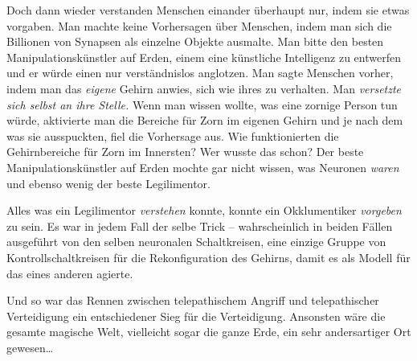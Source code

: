 Doch dann wieder verstanden Menschen einander überhaupt nur, indem sie etwas vorgaben. Man machte keine Vorhersagen über Menschen, indem man sich die Billionen von Synapsen als einzelne Objekte ausmalte. Man bitte den besten Manipulationskünstler auf Erden, einem eine künstliche Intelligenz zu entwerfen und er würde einen nur verständnislos anglotzen. Man sagte Menschen vorher, indem man das \emph{eigene} Gehirn anwies, sich wie ihres zu verhalten. Man \emph{versetzte sich selbst an ihre Stelle.} Wenn man wissen wollte, was eine zornige Person tun würde, aktivierte man die Bereiche für Zorn im eigenen Gehirn und je nach dem was sie ausspuckten, fiel die Vorhersage aus. Wie funktionierten die Gehirnbereiche für Zorn im Innersten? Wer wusste das schon? Der beste Manipulationskünstler auf Erden mochte gar nicht wissen, was Neuronen \emph{waren} und ebenso wenig der beste Legilimentor.

Alles was ein Legilimentor \emph{verstehen} konnte, konnte ein Okklumentiker \emph{vorgeben} zu sein. Es war in jedem Fall der selbe Trick -- wahrscheinlich in beiden Fällen ausgeführt von den selben neuronalen Schaltkreisen, eine einzige Gruppe von Kontrollschaltkreisen für die Rekonfiguration des Gehirns, damit es als Modell für das eines anderen agierte.

Und so war das Rennen zwischen telepathischem Angriff und telepathischer Verteidigung ein entschiedener Sieg für die Verteidigung. Ansonsten wäre die gesamte magische Welt, vielleicht sogar die ganze Erde, ein sehr andersartiger Ort gewesen…

